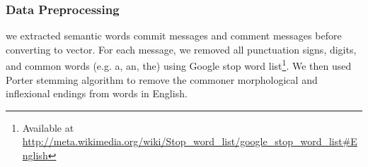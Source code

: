 \documentclass[conference]{IEEEtran}
\begin{document}




%
%
%



\subsubsection{Data Preprocessing}
 we extracted semantic words commit messages and comment messages before converting to vector. For each message, we removed all punctuation signs, digits, and common words (e.g. a, an, the) using Google stop word list\footnote{Available at \url{http://meta.wikimedia.org/wiki/Stop_word_list/google_stop_word_list#English}}. We then used Porter stemming algorithm to remove the commoner morphological and inflexional endings from words in English.
 


\end{document}

